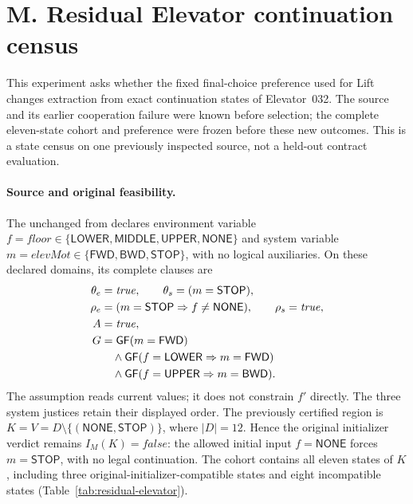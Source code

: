 \section*{M. Residual Elevator continuation census}
\label{sec:supp-residual-elevator}
This experiment asks whether the fixed final-choice preference used for
Lift changes extraction from exact continuation states of Elevator~032.
The source and its earlier cooperation failure were known before selection;
the complete eleven-state cohort and preference were frozen before these
new outcomes. This is a state census on one previously inspected source,
not a held-out contract evaluation.

\paragraph{Source and original feasibility.}
The unchanged  from
\cite{kindartifact} declares environment variable
$f=\mathit{floor}\in\{\mathsf{LOWER},\mathsf{MIDDLE},
\mathsf{UPPER},\mathsf{NONE}\}$ and system variable
$m=\mathit{elevMot}\in\{\mathsf{FWD},\mathsf{BWD},\mathsf{STOP}\}$,
with no logical auxiliaries. On these declared domains, its complete clauses are
\[
\begin{aligned}
\theta_e&=\mathit{true},\qquad \theta_s=(m=\mathsf{STOP}),\\
\rho_e&=(m=\mathsf{STOP}\Rightarrow f\ne\mathsf{NONE}),
\qquad \rho_s=\mathit{true},\\
A&=\mathit{true},\\
G&=\mathsf{G}\mathsf{F}(m=\mathsf{FWD})\\
&\quad{}\land\mathsf{G}\mathsf{F}(f=\mathsf{LOWER}\Rightarrow m=\mathsf{FWD})\\
&\quad{}\land\mathsf{G}\mathsf{F}(f=\mathsf{UPPER}\Rightarrow m=\mathsf{BWD}).
\end{aligned}
\]
The assumption reads current values; it does not constrain $f'$ directly.
The three system justices retain their displayed order. The previously
certified region is $K=V=D\setminus\{(\mathsf{NONE},\mathsf{STOP})\}$,
where $|D|=12$. Hence the original initializer verdict remains
$I_M(K)=\mathit{false}$: the allowed initial input $f=\mathsf{NONE}$
forces $m=\mathsf{STOP}$, with no legal continuation. The cohort contains
all eleven states of $K$, including three original-initializer-compatible
states and eight incompatible states (Table~\ref{tab:residual-elevator}).

